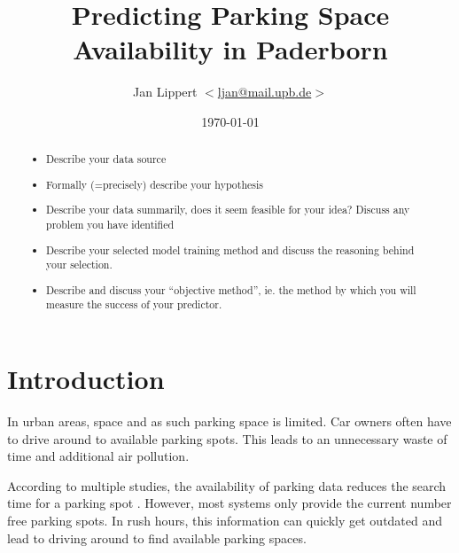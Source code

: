 \documentclass[journal,10pt]{IEEEtran}
\title{Predicting Parking Space Availability in Paderborn}
\author{Jan Lippert \(<\)\href{mailt:ljan@mail.upb.de}{ljan@mail.upb.de}\(>\)}
\date{\today}
\begin{document}
\maketitle

\begin{abstract}
  \begin{itemize}
    \item Describe your data source
    \item Formally (=precisely) describe your hypothesis
    \item Describe your data summarily, does it seem feasible for your idea? Discuss any problem you have identified
    \item Describe your selected model training method and discuss the reasoning behind your selection.
    \item Describe and discuss your ``objective method'', ie. the method by which you will measure the success of your predictor.
  \end{itemize}
\end{abstract}

\section{Introduction}

In urban areas, space and as such parking space is limited. Car owners often have to drive around to available parking spots. This leads to an unnecessary waste of time and additional air pollution. 

According to multiple studies, the availability of parking data reduces the search time for a parking spot \cite{Asakura1994}\cite{Caicedo2010228}. However, most systems only provide the current number free parking spots. In rush hours, this information can quickly get outdated and lead to driving around to find available parking spaces.


\end{document}
